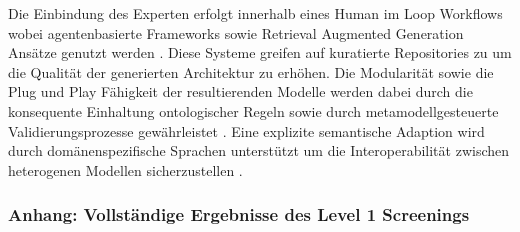 Die Einbindung des Experten erfolgt innerhalb eines Human im Loop Workflows wobei agentenbasierte Frameworks sowie Retrieval Augmented Generation Ansätze genutzt werden \cite{Cibrian.2025, Chis.2025}. Diese Systeme greifen auf kuratierte Repositories zu um die Qualität der generierten Architektur zu erhöhen. Die Modularität sowie die Plug und Play Fähigkeit der resultierenden Modelle werden dabei durch die konsequente Einhaltung ontologischer Regeln sowie durch metamodellgesteuerte Validierungsprozesse gewährleistet \cite{Ferko.2026, Ahlbrecht.2024}. Eine explizite semantische Adaption wird durch domänenspezifische Sprachen unterstützt um die Interoperabilität zwischen heterogenen Modellen sicherzustellen \cite{Meyers.2013}.

\newpage
\subsubsection{Anhang: Vollständige Ergebnisse des Level 1 Screenings}

